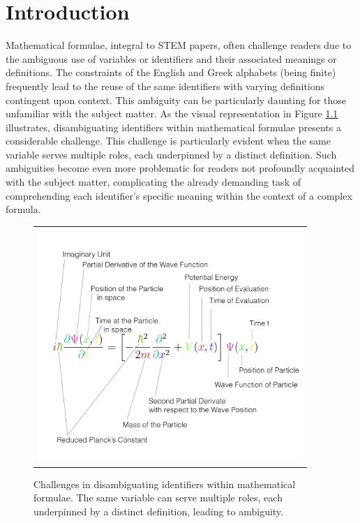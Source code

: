 \chapter{Introduction}\label{chapter:introduction}

Mathematical formulae, integral to \ac{STEM} papers, often challenge readers due to the ambiguous use of variables or identifiers and their associated meanings or definitions. The constraints of the English and Greek alphabets (being finite) frequently lead to the reuse of the same identifiers with varying definitions contingent upon context. This ambiguity can be particularly daunting for those unfamiliar with the subject matter. As the visual representation in Figure \ref{fig:introduction-motivation} illustrates, disambiguating identifiers within mathematical formulae presents a considerable challenge. This challenge is particularly evident when the same variable serves multiple roles, each underpinned by a distinct definition. Such ambiguities become even more problematic for readers not profoundly acquainted with the subject matter, complicating the already demanding task of comprehending each identifier's specific meaning within the context of a complex formula.

\begin{figure}[htpb]
  \centering
  \begin{tabular}{c}
    \includegraphics[width=10cm]{images/introduction-motivation-self.png}
  \end{tabular}
  \caption[Challenges in Disambiguation]{Challenges in disambiguating identifiers within mathematical formulae. The same variable can serve multiple roles, each underpinned by a distinct definition, leading to ambiguity.}\label{fig:introduction-motivation}
\end{figure}

